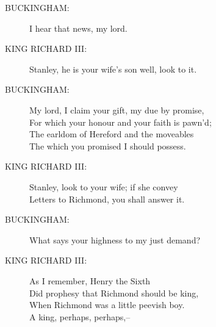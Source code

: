\documentclass{article}
\begin{document}
\begin{description}
\item[BUCKINGHAM:] 
\hspace{1pt}I hear that news, my lord.\\
\end{description}
\begin{description}
\item[KING RICHARD III:] 
\hspace{1pt}Stanley, he is your wife's son well, look to it.\\
\end{description}
\begin{description}
\item[BUCKINGHAM:] 
\hspace{1pt}My lord, I claim your gift, my due by promise,\\
\hspace{1pt}For which your honour and your faith is pawn'd;\\
\hspace{1pt}The earldom of Hereford and the moveables\\
\hspace{1pt}The which you promised I should possess.\\
\end{description}
\begin{description}
\item[KING RICHARD III:] 
\hspace{1pt}Stanley, look to your wife; if she convey\\
\hspace{1pt}Letters to Richmond, you shall answer it.\\
\end{description}
\begin{description}
\item[BUCKINGHAM:] 
\hspace{1pt}What says your highness to my just demand?\\
\end{description}
\begin{description}
\item[KING RICHARD III:] 
\hspace{1pt}As I remember, Henry the Sixth\\
\hspace{1pt}Did prophesy that Richmond should be king,\\
\hspace{1pt}When Richmond was a little peevish boy.\\
\hspace{1pt}A king, perhaps, perhaps,--\\
\end{description}
\end{document}
